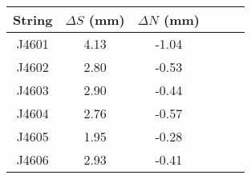 \begin{tabular}{cccccc}
\toprule
String &  $\Delta S$ (mm) &  $\Delta N$ (mm) \\
\midrule
 J4601 &             4.13 &            -1.04 \\
 J4602 &             2.80 &            -0.53 \\
 J4603 &             2.90 &            -0.44 \\
 J4604 &             2.76 &            -0.57 \\
 J4605 &             1.95 &            -0.28 \\
 J4606 &             2.93 &            -0.41 \\
\bottomrule
\end{tabular}


